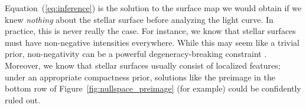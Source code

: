 \documentclass[modern]{aastex62}
\begin{document}


Equation~(\ref{eq:inference}) is the solution to the surface map
we would obtain if we knew \emph{nothing} about the stellar surface
before analyzing the light curve. In practice, this is never really
the case. For instance, we know that stellar surfaces
must have non-negative intensities everywhere. While this may seem
like a trivial prior, non-negativity can be a powerful degeneracy-breaking
constraint \citep[e.g.,][]{Fienup1982}. Moreover, we know that
stellar surfaces usually consist of localized features; under an
appropriate compactness prior, solutions
like the preimage in the bottom row of
Figure~\ref{fig:nullspace_preimage} (for example) could be
confidently ruled out.
\end{document}
